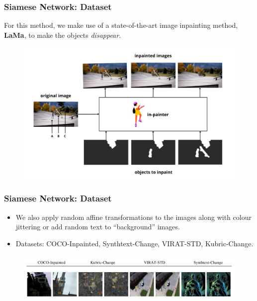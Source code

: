 \documentclass[13.5pt,aspecratio=169, xcolor=dvipsnames]{beamer}
\begin{document}
\begin{frame}
    \onehalfspacing
        \frametitle{Siamese Network: Dataset}
        For this method, we make use of a state-of-the-art image inpainting method, \textbf{LaMa}, to make the objects \textit{disappear}. 
        \begin{figure}[h]
            \centering
            \includegraphics[width=0.9\linewidth]{Lama.png}
        \end{figure}
    \end{frame}
\begin{frame}
    \onehalfspacing
        \frametitle{Siamese Network: Dataset}
       
            \begin{itemize}
                \item We also apply random affine transformations to the images along with colour jittering or add random text to “background” images.
                \item Datasets: COCO-Inpainted, Synthtext-Change, VIRAT-STD, Kubric-Change.
                
            \end{itemize}

            \begin{figure}[h]
                \centering
                \includegraphics[width=\linewidth]{Siamese_dataset.png}
            \end{figure}

    \end{frame}
\end{document}
